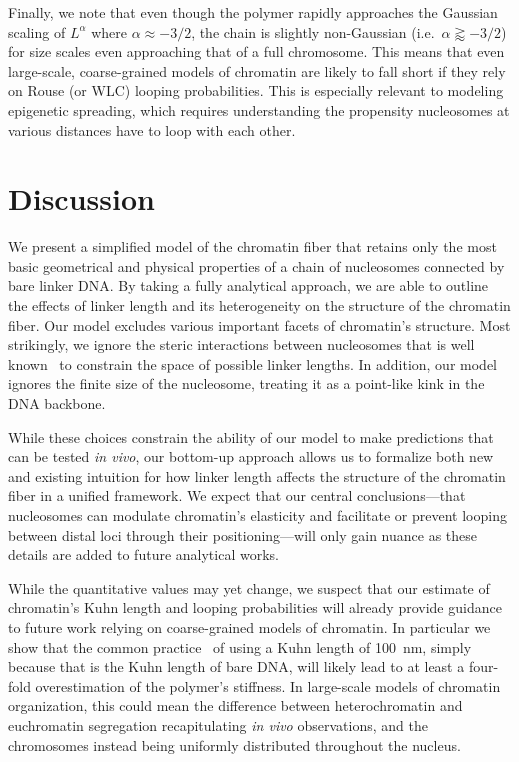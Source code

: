 \documentclass[%
 reprint,
superscriptaddress,
showpacs,preprintnumbers,
 amsmath,amssymb,
 aps,
 prl,
]{revtex4-1}
\begin{document}
Finally, we note that even though the polymer rapidly approaches the Gaussian
    scaling of $L^\alpha$ where $\alpha \approx -3/2$, the chain is slightly
    non-Gaussian (i.e.\ $\alpha \gtrapprox -3/2$) for size scales even
    approaching that of a full chromosome.
This means that even large-scale, coarse-grained models of chromatin are likely
    to fall short if they rely on Rouse (or WLC) looping probabilities.
This is especially relevant to modeling epigenetic spreading, which requires
    understanding the propensity nucleosomes at various distances have to loop with
    each other.

\section{Discussion}

We present a simplified model of the chromatin fiber that retains only the most
    basic geometrical and physical properties of a chain of nucleosomes
    connected by bare linker DNA.\@
By taking a fully analytical approach, we are able to outline the effects of
    linker length and its heterogeneity on the structure of the chromatin fiber.
Our model excludes various important facets of chromatin's structure.
Most strikingly, we ignore the steric interactions between nucleosomes that is
    well known~\cite{widom1992} to constrain the space of possible linker
    lengths.
In addition, our model ignores the finite size of the nucleosome, treating it as
    a point-like kink in the DNA backbone.

While these choices constrain the ability of our model to make predictions that
    can be tested \textit{in vivo}, our bottom-up approach allows us to
    formalize both new and existing intuition for how linker length affects the
    structure of the chromatin fiber in a unified framework.
We expect that our central conclusions---that nucleosomes can modulate
    chromatin's elasticity and facilitate or prevent looping between distal loci
    through their positioning---will only gain nuance as these details are added
    to future analytical works.

While the quantitative values may yet change, we suspect that our estimate of
    chromatin's Kuhn length and looping probabilities will already provide
    guidance to future work relying on coarse-grained models of chromatin.
In particular we show that the common practice~\cite{macphersonInPress,nuebler2018}
    of using a Kuhn length of \SI{100}{\nano\metre}, simply because that is the
    Kuhn length of bare DNA, will likely lead to at least a four-fold
    overestimation of the polymer's stiffness.
In large-scale models of chromatin organization, this could mean the difference
    between heterochromatin and euchromatin segregation recapitulating
    \textit{in vivo} observations, and the chromosomes instead being uniformly
    distributed throughout the nucleus.
\end{document}

